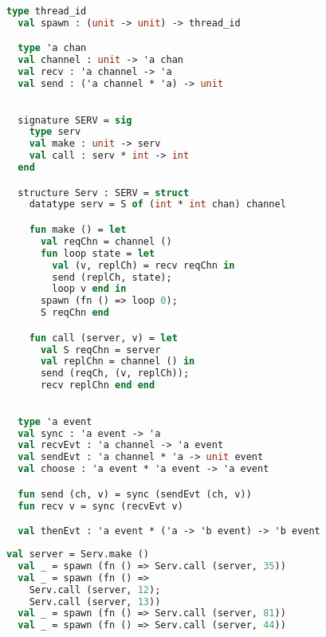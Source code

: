 \documentclass{article}
\begin{document}
\begin{lstlisting}[language=ML, style=codestyle1, escapechar=\%]
  type thread_id
  val spawn : (unit -> unit) -> thread_id

  type 'a chan
  val channel : unit -> 'a chan
  val recv : 'a channel -> 'a
  val send : ('a channel * 'a) -> unit
  \end{lstlisting}

\begin{lstlisting}[language=ML, style=codestyle1, escapechar=\%]

  signature SERV = sig 
    type serv
    val make : unit -> serv
    val call : serv * int -> int
  end

  structure Serv : SERV = struct 
    datatype serv = S of (int * int chan) channel 

    fun make () = let 
      val reqChn = channel ()
      fun loop state = let
        val (v, replCh) = recv reqChn in 
        send (replCh, state);
        loop v end in
      spawn (fn () => loop 0);
      S reqChn end 

    fun call (server, v) = let 
      val S reqChn = server
      val replChn = channel () in 
      send (reqCh, (v, replCh));
      recv replChn end end

  \end{lstlisting}

\begin{lstlisting}[language=ML, style=codestyle1, escapechar=\%]

  type 'a event
  val sync : 'a event -> 'a
  val recvEvt : 'a channel -> 'a event
  val sendEvt : 'a channel * 'a -> unit event
  val choose : 'a event * 'a event -> 'a event

  fun send (ch, v) = sync (sendEvt (ch, v))
  fun recv v = sync (recvEvt v)

  val thenEvt : 'a event * ('a -> 'b event) -> 'b event

  \end{lstlisting}

\begin{lstlisting}[language=ML, style=codestyle1, escapechar=\%]
  val server = Serv.make ()
  val _ = spawn (fn () => Serv.call (server, 35))
  val _ = spawn (fn () => 
    Serv.call (server, 12); 
    Serv.call (server, 13))
  val _ = spawn (fn () => Serv.call (server, 81))
  val _ = spawn (fn () => Serv.call (server, 44))
  \end{lstlisting}
\end{document}
